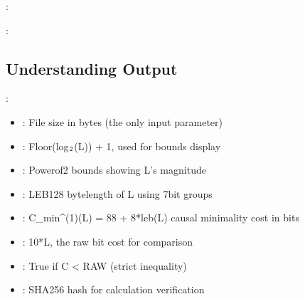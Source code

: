 \documentclass[letterpaper,10pt,english]{sphinxmanual}
\begin{document}
\sphinxAtStartPar
{}:

\begin{sphinxVerbatim}[commandchars=\\\{\}]
    
\end{sphinxVerbatim}

\sphinxAtStartPar
{}:

\begin{sphinxVerbatim}[commandchars=\\\{\}]
    
\end{sphinxVerbatim}


\subsection{Understanding Output}
\label{\detokenize{quickstart:understanding-output}}
\sphinxAtStartPar
{}:
\begin{itemize}
\item {} 
\sphinxAtStartPar
{}: File size in bytes (the only input parameter)

\item {} 
\sphinxAtStartPar
{}: Floor(log\(\sb{\text{2}}\)(L)) + 1, used for bounds display

\item {} 
\sphinxAtStartPar
{}: Power\sphinxhyphen{}of\sphinxhyphen{}2 bounds showing L’s magnitude

\item {} 
\sphinxAtStartPar
{}: LEB128 byte\sphinxhyphen{}length of L using 7\sphinxhyphen{}bit groups

\item {} 
\sphinxAtStartPar
{}: C\_min\textasciicircum{}(1)(L) = 88 + 8*leb(L) causal minimality cost in bits

\item {} 
\sphinxAtStartPar
{}: 10*L, the raw bit cost for comparison

\item {} 
\sphinxAtStartPar
{}: True if C \textless{} RAW (strict inequality)

\item {} 
\sphinxAtStartPar
{}: SHA\sphinxhyphen{}256 hash for calculation verification

\end{itemize}
\end{document}
